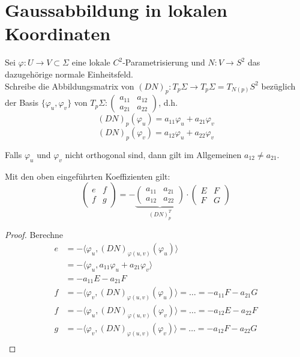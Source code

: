 \documentclass[../main.tex]{subfiles}
\begin{document}
\section{Gaussabbildung in lokalen Koordinaten}
Sei $\varphi:U \rightarrow V \subset \Sigma$ eine lokale $C^{2}$-Parametrisierung und $N:V\rightarrow S^{2}$ das dazugehörige normale Einheitsfeld. \\
Schreibe die Abbildungsmatrix von $(DN)_{p}:T_{p}\Sigma\rightarrow T_{p}\Sigma = T_{N(p)}S^{2}$ bezüglich der Basis $\{\varphi_{u}, \varphi_{v}\}$ von $T_{p}\Sigma: \begin{pmatrix}
    a_{11} & a_{12}\\ a_{21} & a_{22}
\end{pmatrix}$, d.h. $$(DN)_{p}(\varphi_{u}) = a_{11}\varphi_{u} + a_{21}\varphi_{v}$$ $$(DN)_{p}(\varphi_{v}) = a_{12}\varphi_{u} + a_{22}\varphi_{v}$$
\begin{remark}
    Falls $\varphi_{u}$ und $\varphi_{v}$ nicht orthogonal sind, dann gilt im Allgemeinen $a_{12} \neq a_{21}$.
\end{remark}
\begin{lemma}
    Mit den oben eingeführten Koeffizienten gilt: 
    $$\begin{pmatrix}
        e & f \\ f & g
    \end{pmatrix}  = -\underbrace{\begin{pmatrix}
        a_{11} & a_{21} \\ a_{12} & a_{22}
    \end{pmatrix}}_{(DN)_{p}^{T}}\cdot \begin{pmatrix}
        E & F\\ F & G
    \end{pmatrix}$$
\end{lemma}
\begin{proof}
    Berechne
    \begin{align*}
        e &= -\langle\varphi_{u}, (DN)_{\varphi(u,v)}(\varphi_{u})\rangle\\
        &= -\langle\varphi_{u}, a_{11}\varphi_{u} + a_{21}\varphi_{v}\rangle\\
        &= -a_{11} E - a_{21} F\\
        f &= -\langle\varphi_{v}, (DN)_{\varphi(u,v)}(\varphi_{u})\rangle = \dots = -a_{11} F -a_{21} G\\
        f &= -\langle\varphi_{u}, (DN)_{\varphi(u,v)}(\varphi_{v})\rangle = \dots = -a_{12} E -a_{22} F\\
        g &= -\langle\varphi_{v}, (DN)_{\varphi(u,v)}(\varphi_{v})\rangle = \dots = -a_{12} F -a_{22} G\\
    \end{align*}
\end{proof}
\end{document}
